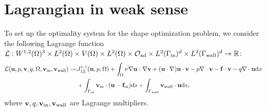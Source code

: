 \documentclass[oneside,11pt]{book}
\numberwithin{equation}{section}
\begin{document}
\section{Lagrangian in weak sense}
To set up the optimality system for the shape optimization problem, we consider the following Lagrange function $\mathcal{L}:W^{1,2}(\Omega)^3\times L^2(\Omega)\times V(\Omega)\times L^2(\Omega)\times\mathcal{O}_{\rm ad}\times L^2(\Gamma_{\rm in})^d\times L^2(\Gamma_{\rm wall})^d\to\mathbb{R}$:
\begin{align}
    \label{weak Lagrangian}
    \mathcal{L}({\bf u},p,{\bf v},q,\Omega,{\bf v}_{\rm in},{\bf v}_{\rm wall}) :=& J_{12}^{\epsilon,\gamma}({\bf u},p,\Omega) + \int_\Omega \nu\nabla{\bf u}:\nabla{\bf v} + ({\bf u}\cdot\nabla){\bf u}\cdot{\bf v} - p\nabla\cdot{\bf v} - {\bf f}\cdot{\bf v} - q\nabla\cdot{\bf u}{\rm d}x \nonumber\\
    &+ \int_{\Gamma_{\rm in}} {\bf v}_{\rm in}\cdot({\bf u} - {\bf f}_{\rm in}){\rm d}s + \int_{\Gamma_{\rm wall}} {\bf v}_{\rm wall}\cdot{\bf u}{\rm d}s,
\end{align}
where ${\bf v},q,{\bf v}_{\rm in},{\bf v}_{\rm wall}$ are Lagrange multipliers.
\end{document}
